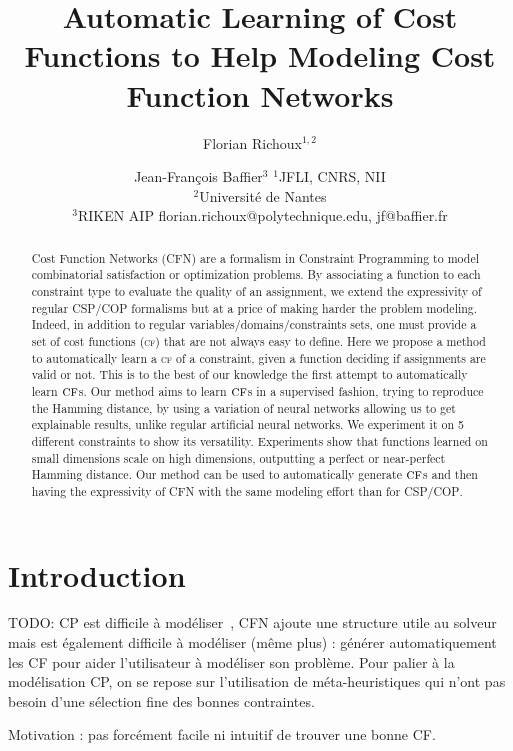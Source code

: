 \documentclass{article}
\title{Automatic Learning of Cost Functions to Help Modeling Cost Function Networks}
\author{
Florian Richoux$^{1,2}$
\and
Jean-François Baffier$^3$
\affiliations
$^1$JFLI, CNRS, NII\\
$^2$Université de Nantes\\
$^3$RIKEN AIP
\emails
florian.richoux@polytechnique.edu,
jf@baffier.fr
}
\newcommand{\csp}{\textsc{CSP}\xspace}
\newcommand{\cop}{\textsc{COP}\xspace}
\newcommand{\cfn}{\textsc{CFN}\xspace}
\newcommand{\cf}{\textsc{cf}\xspace}
\begin{document}
\maketitle

\begin{abstract}
  Cost  Function  Networks  (\cfn)   are  a  formalism  in  Constraint
  Programming  to  model  combinatorial satisfaction  or  optimization
  problems.   By associating  a function  to each  constraint type  to
  evaluate the quality of an assignment, we extend the expressivity of
  regular \csp/\cop  formalisms but  at a price  of making  harder the
  problem    modeling.     Indeed,     in    addition    to    regular
  variables/domains/constraints sets,  one must provide a  set of cost
  functions  (\cf) that  are  not  always easy  to  define.  Here  we
  propose a method to automatically learn a \cf of a constraint, given
  a function deciding if assignments are valid or not.  This is to the
  best  of our  knowledge  the first  attempt  to automatically  learn
  $\cf$s.  Our  method aims to  learn $\cf$s in a  supervised fashion,
  trying to  reproduce the Hamming  distance, by using a  variation of
  neural  networks  allowing us  to  get  explainable results,  unlike
  regular artificial neural networks.  We experiment it on 5 different
  constraints  to   show  its  versatility.   Experiments   show  that
  functions  learned on  small  dimensions scale  on high  dimensions,
  outputting a  perfect or near-perfect Hamming  distance.  Our method
  can be  used to  automatically generate $\cf$s  and then  having the
  expressivity  of  \cfn  with  the  same  modeling  effort  than  for
  \csp/\cop.
\end{abstract}

\section{Introduction}\label{sec:introduction}

TODO: CP  est difficile à  modéliser~\cite{Puget2004,Wallace2003}, CFN
ajoute une structure  utile au solveur mais est  également difficile à
modéliser  (même plus)  : générer  automatiquement les  CF pour  aider
l'utilisateur à modéliser son problème.  Pour palier à la modélisation
CP, on se repose sur  l'utilisation de méta-heuristiques qui n'ont pas
besoin       d'une        sélection       fine        des       bonnes
contraintes. \cite{AMJFH2011,Bessiere2015,CBLS}

Motivation : pas forcément facile ni intuitif de trouver une bonne CF.
\end{document}

